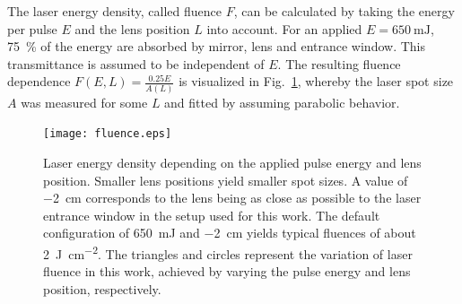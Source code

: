 The laser energy density, called fluence $F$, can be calculated by taking the energy per pulse $E$ and the lens position $L$ into account.
For an applied $E=\qty{650}{\milli\joule}$, \qty{75}{\percent} of the energy are absorbed by mirror, lens and entrance window.
This transmittance is assumed to be independent of $E$.
The resulting fluence dependence $F(E,L)=\frac{0.25E}{A(L)}$ is visualized in Fig.~\ref{Fig:Methods_fluence}, whereby the laser spot size $A$ was measured for some $L$ and fitted by assuming parabolic behavior.

\begin{figure}
    \centering
    \texttt{[image: fluence.eps]}
    \caption{Laser energy density depending on the applied pulse energy and lens position. Smaller lens positions yield smaller spot sizes. A value of \qty{-2}{\cm} corresponds to the lens being as close as possible to the laser entrance window in the setup used for this work.
    The default configuration of \qty{650}{\milli\joule} and \qty{-2}{cm} yields typical fluences of about \qty{2}{\J\per\square\cm}.
    The triangles and circles represent the variation of laser fluence in this work, achieved by varying the pulse energy and lens position, respectively.}
    \label{Fig:Methods_fluence}
\end{figure}

